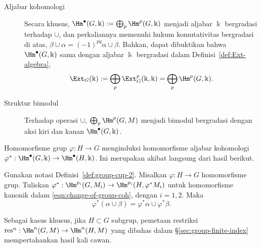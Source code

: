 \begin{description}
	\item[Aljabar kohomologi] Secara khusus,
	$\Hm^\bullet(G,\Bbbk):=\bigoplus_p\Hm^p(G,\Bbbk)$ menjadi aljabar
	$\Bbbk$ bergradasi terhadap $\cup$, dan perkaliannya memenuhi hukum
	komutativitas bergradasi di atas,
	$\beta\cup\alpha=(-1)^{pq}\alpha\cup\beta$. Bahkan, dapat dibuktikan bahwa
	$\Hm^\bullet(G,\Bbbk)$ sama dengan aljabar $\Bbbk$ bergradasi dalam
	Definisi~\ref{def:Ext-algebra},
	\[ \Ext_G(\Bbbk) := \bigoplus_p \Ext^p_G(\Bbbk, \Bbbk) = \bigoplus_p \Hm^p(G, \Bbbk). \]

	\item[Struktur bimodul]
	Terhadap operasi $\cup$, $\bigoplus_p\Hm^p(G,M)$ menjadi bimodul bergradasi
	dengan aksi kiri dan kanan $\Hm^\bullet(G,\Bbbk)$.
\end{description}

Homomorfisme grup $\varphi:H\to G$ menginduksi homomorfisme aljabar kohomologi
$\varphi^*:\Hm^\bullet(G,\Bbbk)\to\Hm^\bullet(H,\Bbbk)$. Ini merupakan akibat
langsung dari hasil berikut.

\begin{proposisi}
	Gunakan notasi Definisi~\ref{def:group-cup-2}. Misalkan
	$\varphi:H\to G$ homomorfisme grup. Tuliskan
	$\varphi^*:\Hm^{p_i}(G,M_i)\to\Hm^{p_i}(H,\varphi^*M_i)$ untuk
	homomorfisme kanonik dalam \eqref{eqn:change-of-group-coh}, dengan $i=1,2$.
	Maka
	\[ \varphi^*(\alpha \cup \beta) = \varphi^* \alpha \cup \varphi^* \beta. \]

	Sebagai kasus khusus, jika $H\subset G$ subgrup, pemetaan restriksi
	$\mathrm{res}^n:\Hm^n(G,M)\to\Hm^n(H,M)$ yang dibahas dalam
	\S\ref{sec:group-finite-index} mempertahankan hasil kali cawan.
\end{proposisi}

